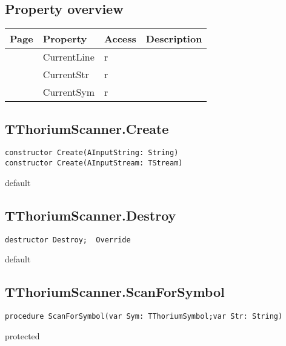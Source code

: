 \subsection{Property overview}
\label{thoriumcore:thorium:tthoriumscanner:properties}
\begin{tabularx}{\textwidth}{lllX}
Page & Property & Access & Description \\ \hline
\pageref{thoriumcore:thorium:tthoriumscanner:currentline} & CurrentLine & r &  \\
\pageref{thoriumcore:thorium:tthoriumscanner:currentstr} & CurrentStr & r &  \\
\pageref{thoriumcore:thorium:tthoriumscanner:currentsym} & CurrentSym & r &  \\
\hline
\end{tabularx}
\subsection{TThoriumScanner.Create}
\label{thoriumcore:thorium:tthoriumscanner:create}
\begin{FPCList}
\Synopsis
\Declaration 

\begin{verbatim}
constructor Create(AInputString: String)
constructor Create(AInputStream: TStream)
\end{verbatim}
\Visibility
default
\Description
\Errors
\end{FPCList}
\subsection{TThoriumScanner.Destroy}
\label{thoriumcore:thorium:tthoriumscanner:destroy}
\begin{FPCList}
\Synopsis
\Declaration 

\begin{verbatim}
destructor Destroy;  Override
\end{verbatim}
\Visibility
default
\Description
\Errors
\end{FPCList}
\subsection{TThoriumScanner.ScanForSymbol}
\label{thoriumcore:thorium:tthoriumscanner:scanforsymbol}
\begin{FPCList}
\Synopsis
\Declaration 

\begin{verbatim}
procedure ScanForSymbol(var Sym: TThoriumSymbol;var Str: String)
\end{verbatim}
\Visibility
protected
\Description
\Errors
\end{FPCList}
